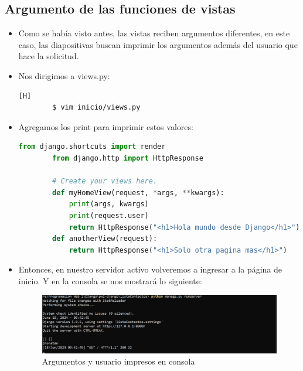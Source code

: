 \documentclass{article}
\begin{document}
        \subsection{Argumento de las funciones de vistas}
        \begin{itemize}
            \item Como se había visto antes, las vistas reciben argumentos diferentes, en este caso, las diapositivas buscan imprimir los argumentos además del usuario que hace la solicitud.
            \item Nos dirigimos a views.py:

        \begin{lstlisting}[language=bash,caption={Ingresando a views.py}][H]
        $ vim inicio/views.py
        \end{lstlisting}

            \item Agregamos los print para imprimir estos valores:
        
        \begin{lstlisting}[language=Python, caption={Impresión de argumentos dentro de la función}]
        from django.shortcuts import render
        from django.http import HttpResponse
        
        # Create your views here.
        def myHomeView(request, *args, **kwargs):
            print(args, kwargs)
            print(request.user)
            return HttpResponse("<h1>Hola mundo desde Django</h1>")
        def anotherView(request):
            return HttpResponse("<h1>Solo otra pagina mas</h1>")
        \end{lstlisting}

            \item Entonces, en nuestro servidor activo volveremos a ingresar a la página de inicio. Y en la consola se nos mostrará lo siguiente:

        \begin{figure}[H]
            \centering
            \includegraphics[width=1\linewidth]{img/Argumentos.png}
            \caption{Argumentos y usuario impresos en consola}
            \label{fig:enter-label}
        \end{figure}


\end{itemize}
\end{document}
